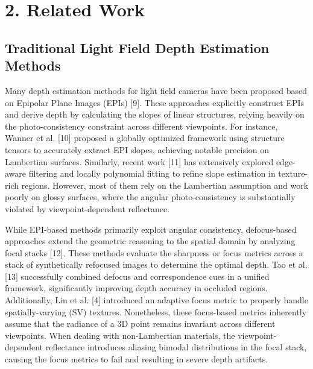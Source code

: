 \section{2. Related Work}

\subsection{Traditional Light Field Depth Estimation Methods}

Many depth estimation methods for light field cameras have been proposed based on Epipolar Plane Images (EPIs) [9]. These approaches explicitly construct EPIs and derive depth by calculating the slopes of linear structures, relying heavily on the photo-consistency constraint across different viewpoints. For instance, Wanner et al. [10] proposed a globally optimized framework using structure tensors to accurately extract EPI slopes, achieving notable precision on Lambertian surfaces. Similarly, recent work [11] has extensively explored edge-aware filtering and locally polynomial fitting to refine slope estimation in texture-rich regions. However, most of them rely on the Lambertian assumption and work poorly on glossy surfaces, where the angular photo-consistency is substantially violated by viewpoint-dependent reflectance.

While EPI-based methods primarily exploit angular consistency, defocus-based approaches extend the geometric reasoning to the spatial domain by analyzing focal stacks [12]. These methods evaluate the sharpness or focus metrics across a stack of synthetically refocused images to determine the optimal depth. Tao et al. [13] successfully combined defocus and correspondence cues in a unified framework, significantly improving depth accuracy in occluded regions. Additionally, Lin et al. [4] introduced an adaptive focus metric to properly handle spatially-varying (SV) textures. Nonetheless, these focus-based metrics inherently assume that the radiance of a 3D point remains invariant across different viewpoints. When dealing with non-Lambertian materials, the viewpoint-dependent reflectance introduces aliasing bimodal distributions in the focal stack, causing the focus metrics to fail and resulting in severe depth artifacts.

